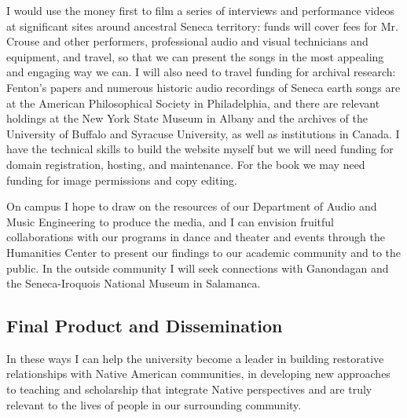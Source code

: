 \documentclass{neh}
\begin{document}
I would use the money first to film a series of interviews and performance
videos at significant sites around ancestral Seneca territory: funds will
cover fees for Mr. Crouse and other performers, professional audio and visual
technicians and equipment, and travel, so that we can present the songs in the
most appealing and engaging way we can.
I will also need to travel funding for archival research: Fenton's papers
and numerous historic audio recordings of Seneca earth songs are at the
American Philosophical Society in Philadelphia, and there are relevant
holdings at the New York State Museum in Albany and the archives of the
University of Buffalo and Syracuse University, as well as institutions in
Canada.
I have the technical skills to build the website myself but we will need
funding for domain registration, hosting, and maintenance.
For the book we may need funding for image permissions and copy editing.

On campus I hope to draw on the resources of our Department of Audio and Music
Engineering to produce the media, and I can envision fruitful collaborations
with our programs in dance and theater and events through the Humanities
Center to present our findings to our academic community and to the public.
In the outside community I will seek connections with Ganondagan and the
Seneca-Iroquois National Museum in Salamanca.

\subsection{Final Product and Dissemination}


In these ways I can help the university become a leader in building restorative
relationships with Native American communities, in developing new approaches
to teaching and scholarship that integrate Native perspectives and are truly
relevant to the lives of people in our surrounding community.
\end{document}
